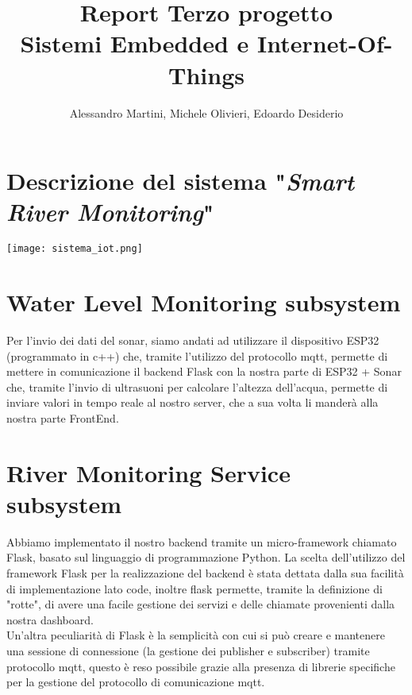 \documentclass{article}
\title{Report Terzo progetto \\ Sistemi Embedded e Internet-Of-Things}
\author{Alessandro Martini, Michele Olivieri, Edoardo Desiderio}
\date{}
\begin{document}
\maketitle

\section*{Descrizione del sistema "\textit{Smart River Monitoring}"}

\texttt{[image: sistema\_iot.png]}

\section*{Water Level Monitoring subsystem}
Per l'invio dei dati del sonar, siamo andati ad utilizzare il dispositivo ESP32 (programmato in c++) che, tramite l'utilizzo del protocollo mqtt, permette di mettere in comunicazione il backend Flask con la nostra parte di ESP32 + Sonar che, tramite l'invio di ultrasuoni per calcolare l'altezza dell'acqua, permette di inviare valori in tempo reale al nostro server, che a sua volta li manderà alla nostra parte FrontEnd.

\section*{River Monitoring Service subsystem}
Abbiamo implementato il nostro backend tramite un micro-framework chiamato Flask, basato sul linguaggio di programmazione Python. La scelta dell'utilizzo del framework Flask per la realizzazione del backend è stata dettata dalla sua facilità di implementazione lato code, inoltre flask permette, tramite la definizione di "rotte", di avere una facile gestione dei servizi e delle chiamate provenienti dalla nostra dashboard. \\ Un'altra peculiarità di Flask è la semplicità con cui si può creare e mantenere una sessione di connessione (la gestione dei publisher e subscriber) tramite protocollo mqtt, questo è reso possibile grazie alla presenza di librerie specifiche per la gestione del protocollo di comunicazione mqtt.
\end{document}
